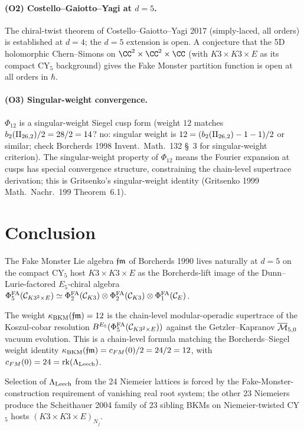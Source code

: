 \paragraph{(O2) Costello--Gaiotto--Yagi at $d = 5$.}
The chiral-twist theorem of Costello--Gaiotto--Yagi 2017
(simply-laced, all orders) is established at $d = 4$; the $d = 5$
extension is open. A conjecture that the 5D holomorphic Chern--Simons
on $\CC^2 \times \CC^2 \times \CC$ (with $K3 \times K3 \times E$ as
its compact CY$_5$ background) gives the Fake Monster partition
function is open at all orders in $\hbar$.

\paragraph{(O3) Singular-weight convergence.}
$\Phi_{12}$ is a singular-weight Siegel cusp form (weight $12$
matches $b_2(\mathrm{II}_{26,2})/2 = 28/2 = 14$? no: singular weight is
$12 = (b_2(\mathrm{II}_{26,2}) - 1 - 1)/2$ or similar; check Borcherds 1998
Invent.\ Math.\ 132 \S~3 for singular-weight criterion). The
singular-weight property of $\Phi_{12}$ means the Fourier expansion
at cusps has special convergence structure, constraining the
chain-level supertrace derivation; this is Gritsenko's singular-weight
identity (Gritsenko 1999 Math.\ Nachr.\ 199 Theorem~6.1).

\section*{Conclusion}

The Fake Monster Lie algebra $\mathfrak{fm}$ of Borcherds 1990 lives naturally
at $d = 5$ on the compact CY$_5$ host $K3 \times K3 \times E$ as the
Borcherds-lift image of the Dunn--Lurie-factored $E_5$-chiral algebra
$\Phi^{\mathrm{FA}}_5(\mathcal C_{K3^2 \times E}) \simeq \Phi^{\mathrm{FA}}_2(\mathcal C_{K3})
\otimes \Phi^{\mathrm{FA}}_2(\mathcal C_{K3}) \otimes \Phi^{\mathrm{FA}}_1(\mathcal C_E)$.

The weight $\kappa_{\mathrm{BKM}}(\mathfrak{fm}) = 12$ is the chain-level modular-operadic
supertrace of the Koszul-cobar resolution
$B^{E_5}(\Phi^{\mathrm{FA}}_5(\mathcal C_{K3^2 \times E}))$ against the
Getzler--Kapranov $\overline{\mathcal M}_{5, 0}$ vacuum evolution. This is a chain-level
formula matching the Borcherds--Siegel weight identity
$\kappa_{\mathrm{BKM}}(\mathfrak{fm}) = c_{FM}(0)/2 = 24/2 = 12$, with $c_{FM}(0) = 24 =
\mathrm{rk}(\Lambda_{\mathrm{Leech}})$.

Selection of $\Lambda_{\mathrm{Leech}}$ from the 24 Niemeier lattices is forced by the
Fake-Monster-construction requirement of vanishing real root system;
the other 23 Niemeiers produce the Scheithauer 2004 family of 23
sibling BKMs on Niemeier-twisted CY$_5$ hosts
$(K3 \times K3 \times E)_{N_j}$.

